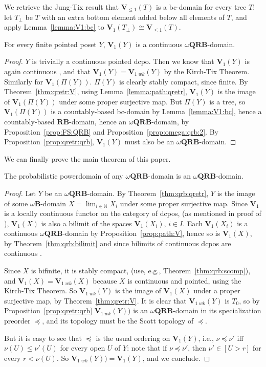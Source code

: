 \documentclass{LMCS}
\newcommand\nat{\mathbb{N}}
\newcommand\QRB{\mathbf{QRB}}
\newcommand\B{\mathbf{B}}
\newcommand\RB{\mathbf{RB}}
\newcommand\Val{\mathbf V}
\begin{document}
We retrieve the Jung-Tix result that $\Val_{\leq 1} (T)$ is a
bc-domain for every tree $T$: let $T_\bot$ be $T$ with an extra bottom
element added below all elements of $T$, and apply
Lemma~\ref{lemma:V1:bc} to $\Val_1 (T_\bot) \cong \Val_{\leq 1} (T)$.

\begin{prop}
  \label{prop:path:V}
  For every finite pointed poset $Y$, $\Val_1 (Y)$ is a continuous
  $\omega\QRB$-domain.
\end{prop}
\begin{proof}
  $Y$ is trivially a continuous pointed dcpo.  Then we know that
  $\Val_1 (Y)$ is again continuous \cite[Section~3]{Edalat:int}, and
  that $\Val_1 (Y) = \Val_{1\;wk} (Y)$ by the Kirch-Tix Theorem.
  Similarly for $\Val_1 (\Pi (Y))$.  $\Pi (Y)$ is clearly stably
  compact, since finite.  By Theorem~\ref{thm:qretr:V}, using
  Lemma~\ref{lemma:path:qretr}, $\Val_1 (Y)$ is the image of $\Val_1
  (\Pi (Y))$ under some proper surjective map.  But $\Pi (Y)$ is a tree,
  so $\Val_1 (\Pi (Y))$ is a countably-based bc-domain by
  Lemma~\ref{lemma:V1:bc}, hence a countably-based $\RB$-domain, hence
  an $\omega\QRB$-domain, by Proposition~\ref{prop:FS:QRB} and
  Proposition~\ref{prop:omega:qrb:2}.  By
  Proposition~\ref{prop:qretr:qrb}, $\Val_1 (Y)$ must also be an
  $\omega\QRB$-domain.
\end{proof}
We can finally prove the main theorem of this paper.
\begin{thm}
  \label{thm:qrb:V}
  The probabilistic powerdomain of any $\omega\QRB$-domain is an
  $\omega\QRB$-domain.
\end{thm}
\begin{proof}
  Let $Y$ be an $\omega\QRB$-domain.  By Theorem~\ref{thm:qrb:qretr},
  $Y$ is the image of some $\omega\B$-domain $X = \lim_{i \in \nat}
  X_i$ under some proper surjective map.  Since $\Val_1$ is a locally
  continuous functor on the category of dcpos, (as mentioned in proof
  of \cite[Lemma~11]{JT:troublesome}), $\Val_1 (X)$ is also a bilimit
  of the spaces $\Val_1 (X_i)$, $i \in I$.  Each $\Val_1 (X_i)$ is a
  continuous $\omega\QRB$-domain by Proposition~\ref{prop:path:V},
  hence so is $\Val_1 (X)$, by Theorem~\ref{thm:qrb:bilimit} and since
  bilimits of continuous dcpos are continuous
  \cite[Theorem~3.3.11]{AJ:domains}.

  Since $X$ is bifinite, it is stably compact, (use, e.g.,
  Theorem~\ref{thm:qrb:scomp}), and $\Val_1 (X) = \Val_{1\;wk} (X)$
  because $X$ is continuous and pointed, using the Kirch-Tix Theorem.
  So $\Val_{1\;wk} (Y)$ is the image of $\Val_1 (X)$ under a proper
  surjective map, by Theorem~\ref{thm:qretr:V}.  It is clear that
  $\Val_{1\;wk} (Y)$ is $T_0$, so by Proposition~\ref{prop:qretr:qrb}
  $\Val_{1\;wk} (Y))$ is an $\omega\QRB$-domain in its specialization
  preorder $\preceq$, and its topology must be the Scott topology of
  $\preceq$.

  But it is easy to see that $\preceq$ is the usual ordering on
  $\Val_1 (Y)$, i.e., $\nu \preceq \nu'$ iff $\nu (U) \leq \nu' (U)$
  for every open $U$ of $Y$: note that if $\nu \preceq \nu'$, then
  $\nu' \in [U > r]$ for every $r < \nu (U)$.  So $\Val_{1\;wk} (Y)) =
  \Val_1 (Y)$, and we conclude.
\end{proof}
\end{document}
